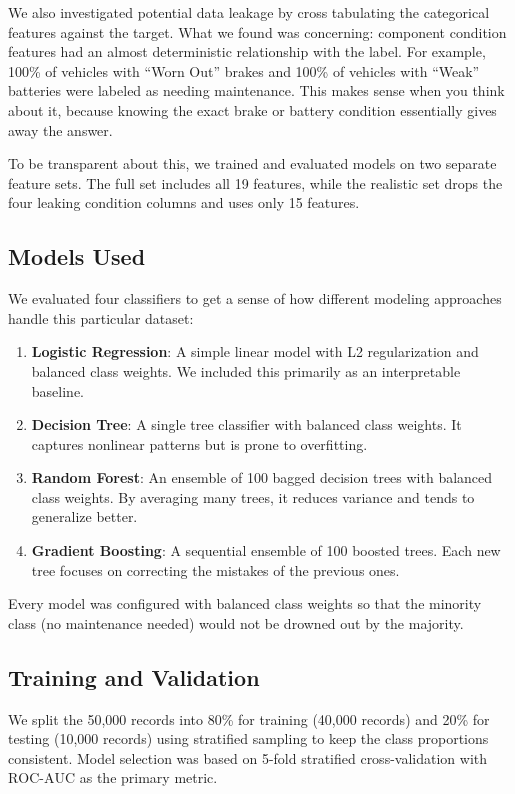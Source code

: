 \documentclass[conference]{IEEEtran}
\begin{document}
We also investigated potential data leakage by cross tabulating the categorical features against the target. What we found was concerning: component condition features had an almost deterministic relationship with the label. For example, 100\% of vehicles with ``Worn Out'' brakes and 100\% of vehicles with ``Weak'' batteries were labeled as needing maintenance. This makes sense when you think about it, because knowing the exact brake or battery condition essentially gives away the answer.

To be transparent about this, we trained and evaluated models on two separate feature sets. The full set includes all 19 features, while the realistic set drops the four leaking condition columns and uses only 15 features.

\subsection{Models Used}

We evaluated four classifiers to get a sense of how different modeling approaches handle this particular dataset:

\begin{enumerate}
    \item \textbf{Logistic Regression}: A simple linear model with L2 regularization and balanced class weights. We included this primarily as an interpretable baseline.
    \item \textbf{Decision Tree}: A single tree classifier with balanced class weights. It captures nonlinear patterns but is prone to overfitting.
    \item \textbf{Random Forest}: An ensemble of 100 bagged decision trees with balanced class weights. By averaging many trees, it reduces variance and tends to generalize better.
    \item \textbf{Gradient Boosting}: A sequential ensemble of 100 boosted trees. Each new tree focuses on correcting the mistakes of the previous ones.
\end{enumerate}

Every model was configured with balanced class weights so that the minority class (no maintenance needed) would not be drowned out by the majority.

\subsection{Training and Validation}

We split the 50,000 records into 80\% for training (40,000 records) and 20\% for testing (10,000 records) using stratified sampling to keep the class proportions consistent. Model selection was based on 5-fold stratified cross-validation with $\text{ROC-AUC}$ as the primary metric.
\end{document}
